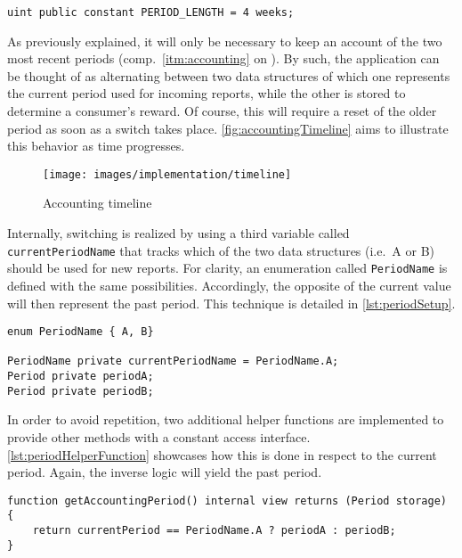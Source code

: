\begin{lstlisting}[caption=Definition of period length, label=lst:periodDataStructure]
uint public constant PERIOD_LENGTH = 4 weeks;
\end{lstlisting}

As previously explained, it will only be necessary to keep an account of the two most recent periods (comp.~\ref{itm:accounting} on ). By such, the application can be thought of as alternating between two data structures of which one represents the current period used for incoming reports, while the other is stored to determine a consumer's reward. Of course, this will require a reset of the older period as soon as a switch takes place. \autoref{fig:accountingTimeline} aims to illustrate this behavior as time progresses. 

\begin{figure}[hbt]
	  \texttt{[image: images/implementation/timeline]}
	  \caption{Accounting timeline}
	  \label{fig:accountingTimeline}
\end{figure}

\FloatBarrier

Internally, switching is realized by using a third variable called \texttt{currentPeriodName} that tracks which of the two data structures (i.e.~A or B) should be used for new reports. For clarity, an enumeration called \texttt{PeriodName} is defined with the same possibilities. Accordingly, the opposite of the current value will then represent the past period. This technique is detailed in \autoref{lst:periodSetup}. 

\begin{lstlisting}[language=Solidity, caption=Declaration of periods and definition of current period tracker, label=lst:periodSetup]
enum PeriodName { A, B}

PeriodName private currentPeriodName = PeriodName.A;
Period private periodA;
Period private periodB;
\end{lstlisting}

In order to avoid repetition, two additional helper functions are implemented to provide other methods with a constant access interface.  \autoref{lst:periodHelperFunction} showcases how this is done in respect to the current period. Again, the inverse logic will yield the past period. 

\begin{lstlisting}[language=Solidity, caption=Helper function to retrieve current period, label=lst:periodHelperFunction]
function getAccountingPeriod() internal view returns (Period storage) {
	return currentPeriod == PeriodName.A ? periodA : periodB;
}
\end{lstlisting}
 
